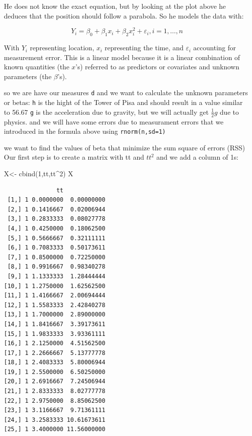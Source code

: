 \documentclass[
  letterpaper,
  DIV=11,
  numbers=noendperiod]{scrartcl}
\newenvironment{Shaded}{\begin{snugshade}}{\end{snugshade}}
\newcommand{\DecValTok}[1]{\textcolor[rgb]{0.68,0.00,0.00}{#1}}
\newcommand{\FunctionTok}[1]{\textcolor[rgb]{0.28,0.35,0.67}{#1}}
\newcommand{\NormalTok}[1]{\textcolor[rgb]{0.00,0.23,0.31}{#1}}
\newcommand{\OtherTok}[1]{\textcolor[rgb]{0.00,0.23,0.31}{#1}}
\newcommand{\SpecialCharTok}[1]{\textcolor[rgb]{0.37,0.37,0.37}{#1}}
\begin{document}
He does not know the exact equation, but by looking at the plot above he
deduces that the position should follow a parabola. So he models the
data with:

\[ 
Y_i = \beta_0 + \beta_1 x_i + \beta_2 x_i^2 + \varepsilon_i, i=1,\dots,n 
\]

With \(Y_i\) representing location, \(x_i\) representing the time, and
\(\varepsilon_i\) accounting for measurement error. This is a linear
model because it is a linear combination of known quantities (the
\(x\)'s) referred to as predictors or covariates and unknown parameters
(the \(\beta\)'s).

so we are have our measures \texttt{d} and we want to calculate the
unknown parameters or betas: \texttt{h} is the hight of the Tower of
Pisa and should result in a value similar to 56.67 \texttt{g} is the
acceleration due to gravity, but we will actually get \(\frac{1}{2}g\)
due to physics. and we will have some errors due to measurament errors
that we introduced in the formula above using \texttt{rnorm(n,sd=1)}

we want to find the values of beta that minimize the sum square of
errors (RSS) Our first step is to create a matrix with tt and \(tt^2\)
and we add a column of 1s:

\begin{Shaded}
\begin{Highlighting}[]
\NormalTok{X}\OtherTok{\textless{}{-}} \FunctionTok{cbind}\NormalTok{(}\DecValTok{1}\NormalTok{,tt,tt}\SpecialCharTok{\^{}}\DecValTok{2}\NormalTok{)}
\NormalTok{X}
\end{Highlighting}
\end{Shaded}

\begin{verbatim}
               tt            
 [1,] 1 0.0000000  0.00000000
 [2,] 1 0.1416667  0.02006944
 [3,] 1 0.2833333  0.08027778
 [4,] 1 0.4250000  0.18062500
 [5,] 1 0.5666667  0.32111111
 [6,] 1 0.7083333  0.50173611
 [7,] 1 0.8500000  0.72250000
 [8,] 1 0.9916667  0.98340278
 [9,] 1 1.1333333  1.28444444
[10,] 1 1.2750000  1.62562500
[11,] 1 1.4166667  2.00694444
[12,] 1 1.5583333  2.42840278
[13,] 1 1.7000000  2.89000000
[14,] 1 1.8416667  3.39173611
[15,] 1 1.9833333  3.93361111
[16,] 1 2.1250000  4.51562500
[17,] 1 2.2666667  5.13777778
[18,] 1 2.4083333  5.80006944
[19,] 1 2.5500000  6.50250000
[20,] 1 2.6916667  7.24506944
[21,] 1 2.8333333  8.02777778
[22,] 1 2.9750000  8.85062500
[23,] 1 3.1166667  9.71361111
[24,] 1 3.2583333 10.61673611
[25,] 1 3.4000000 11.56000000
\end{verbatim}
\end{document}
